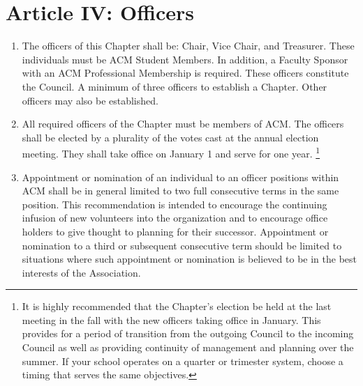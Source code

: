 \section*{Article IV: Officers}

\begin{enumerate}
    \item The officers of this Chapter shall be: Chair, Vice Chair, and Treasurer.
    These individuals must be ACM Student Members.
    In addition, a Faculty Sponsor with an ACM Professional Membership is required.
    These officers constitute the Council.
    A minimum of three officers to establish a Chapter. Other officers may also be established.
    \item All required officers of the Chapter must be members of ACM.
    The officers shall be elected by a plurality of the votes cast at the annual election meeting.
    They shall take office on January 1 and serve for one year.
    \footnote{
      It is highly recommended that the Chapter's election be held at the last meeting in the fall with the new officers taking office in January.
    This provides for a period of transition from the outgoing Council to the incoming Council as well as providing continuity of management and planning over the summer.
    If your school operates on a quarter or trimester system, choose a timing that serves the same objectives.}
  \item Appointment or nomination of an individual to an officer positions within ACM shall be in general limited to two full consecutive terms in the same position.
  This recommendation is intended to encourage the continuing infusion of new volunteers into the organization and to encourage office holders to give thought to planning for their successor.
  Appointment or nomination to a third or subsequent consecutive term should be limited to situations where such appointment or nomination is believed to be in the best interests of the Association.
\end{enumerate}
